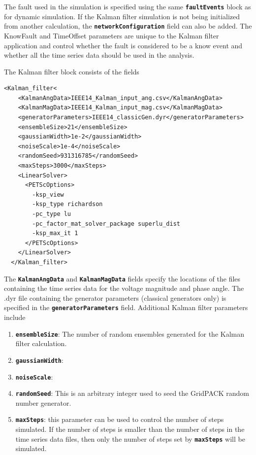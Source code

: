 \documentclass[12pt]{report} %
\begin{document}
The fault used in the simulation is specified using the same \texttt{\textbf{faultEvents}} block as for dynamic simulation. If the Kalman filter simulation is not being initialized from another calculation, the \texttt{\textbf{networkConfiguration}} field can also be added. The KnowFault and TimeOffset parameters are unique to the Kalman filter application and control whether the fault is considered to be a know event and whether all the time series data should be used in the analysis.

The Kalman filter block consists of the fields

{
\color{blue}
\begin{Verbatim}[fontseries=b]
  <Kalman_filter<
    <KalmanAngData>IEEE14_Kalman_input_ang.csv</KalmanAngData>
    <KalmanMagData>IEEE14_Kalman_input_mag.csv</KalmanMagData>
    <generatorParameters>IEEE14_classicGen.dyr</generatorParameters>
    <ensembleSize>21</ensembleSize>
    <gaussianWidth>1e-2</gaussianWidth>
    <noiseScale>1e-4</noiseScale>
    <randomSeed>931316785</randomSeed>
    <maxSteps>3000</maxSteps>
    <LinearSolver>
      <PETScOptions>
        -ksp_view
        -ksp_type richardson
        -pc_type lu
        -pc_factor_mat_solver_package superlu_dist
        -ksp_max_it 1
      </PETScOptions>
    </LinearSolver>
  </Kalman_filter>
\end{Verbatim}
}

The \texttt{\textbf{KalmanAngData}} and \texttt{\textbf{KalmanMagData}} fields specify the locations of the files containing the time series data for the voltage magnitude and phase angle. The .dyr file containing the generator parameters (classical generators only) is specified in the \texttt{\textbf{generatorParameters}} field. Additional Kalman filter parameters include

\begin{enumerate}
\item  \texttt{\textbf{ensembleSize}}: The number of random ensembles generated for the Kalman filter calculation.

\item  \texttt{\textbf{gaussianWidth}}: 

\item  \texttt{\textbf{noiseScale}}:

\item  \texttt{\textbf{randomSeed}}: This is an arbitrary integer used to seed the GridPACK random number generator.

\item  \texttt{\textbf{maxSteps}}: this parameter can be used to control the number of steps simulated. If the number of steps is smaller than the number of steps in the time series data files, then only the number of steps set by \texttt{\textbf{maxSteps}} will be simulated.
\end{enumerate}
\end{document}
